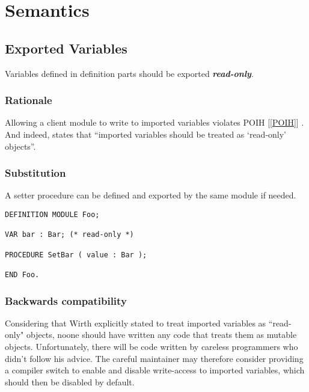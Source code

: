 \documentclass[10pt,a4paper]{article}
\renewcommand{\emph}[1]{\textbf{\textit{#1}}}
\begin{document}
\section{Semantics}

\subsection{Exported Variables}

Variables defined in definition parts should be exported \emph{read-only}. 

\subsubsection{Rationale}

Allowing a client module to write to imported variables violates POIH
[\ref{POIH}] \cite{Parnas72}. And indeed, \cite[p.88]{Wirth88} states
that ``imported variables should be treated as `read-only' objects''.

\subsubsection{Substitution}

A setter procedure can be defined and exported by the same module if needed.

\lstset{style=modula2}
\begin{lstlisting}
DEFINITION MODULE Foo;

VAR bar : Bar; (* read-only *)

PROCEDURE SetBar ( value : Bar );

END Foo.
\end{lstlisting}

\subsubsection{Backwards compatibility}

Considering that Wirth explicitly stated to treat imported variables as
``read-only" objects, noone should have written any code that treats them
as mutable objects. Unfortunately, there will be code written by careless
programmers who didn't follow his advice. The careful maintainer may therefore
consider providing a compiler switch to enable and disable write-access to
imported variables, which should then be disabled by default.
\end{document}

